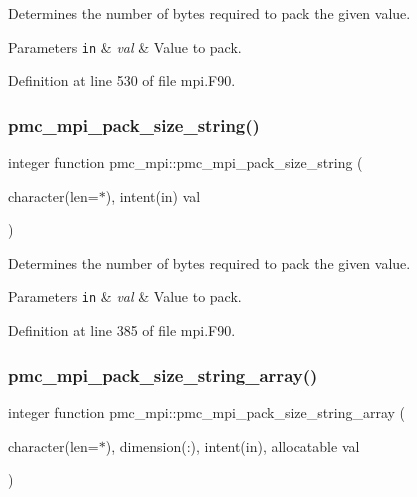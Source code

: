 Determines the number of bytes required to pack the given value. 


\begin{DoxyParams}[1]{Parameters}
\mbox{\tt in}  & {\em val} & Value to pack. \\
\hline
\end{DoxyParams}


Definition at line 530 of file mpi.\+F90.

\mbox{\label{namespacepmc__mpi_aa497879e21deb212bd15ee56092de3cd}} 
\subsubsection{\texorpdfstring{pmc\+\_\+mpi\+\_\+pack\+\_\+size\+\_\+string()}{pmc\_mpi\_pack\_size\_string()}}
{\footnotesize\ttfamily integer function pmc\+\_\+mpi\+::pmc\+\_\+mpi\+\_\+pack\+\_\+size\+\_\+string (\begin{DoxyParamCaption}\item[{character(len=$\ast$), intent(in)}]{val }\end{DoxyParamCaption})}



Determines the number of bytes required to pack the given value. 


\begin{DoxyParams}[1]{Parameters}
\mbox{\tt in}  & {\em val} & Value to pack. \\
\hline
\end{DoxyParams}


Definition at line 385 of file mpi.\+F90.

\mbox{\label{namespacepmc__mpi_af8c1a5c67870b10d526b694eb81d1cfd}} 
\subsubsection{\texorpdfstring{pmc\+\_\+mpi\+\_\+pack\+\_\+size\+\_\+string\+\_\+array()}{pmc\_mpi\_pack\_size\_string\_array()}}
{\footnotesize\ttfamily integer function pmc\+\_\+mpi\+::pmc\+\_\+mpi\+\_\+pack\+\_\+size\+\_\+string\+\_\+array (\begin{DoxyParamCaption}\item[{character(len=$\ast$), dimension(\+:), intent(in), allocatable}]{val }\end{DoxyParamCaption})}



